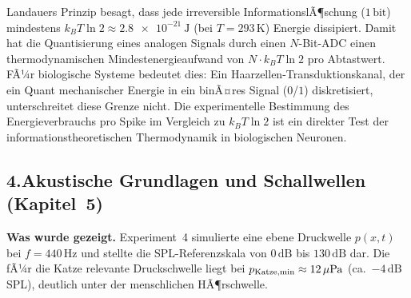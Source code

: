 ﻿\documentclass[12pt,a4paper,titlepage]{report}
\begin{document}
\begin{itemize}[leftmargin=2em]
    Landauers Prinzip besagt, dass jede irreversible InformationslÃ¶schung
    ($1\,\mathrm{bit}$) mindestens $k_B T \ln 2 \approx
    \SI{2.8e-21}{\joule}$ (bei $T=293\,\mathrm{K}$) Energie dissipiert.
    Damit hat die Quantisierung eines analogen Signals durch einen
    $N$-Bit-ADC einen thermodynamischen Mindestenergieaufwand von
    $N \cdot k_B T \ln 2$ pro Abtastwert.
    FÃ¼r biologische Systeme bedeutet dies: Ein Haarzellen-Transduktionskanal,
    der ein Quant mechanischer Energie in ein binÃ¤res Signal ($0$/$1$)
    diskretisiert, unterschreitet diese Grenze nicht.
    Die experimentelle Bestimmung des Energieverbrauchs pro Spike
    im Vergleich zu $k_B T \ln 2$ ist ein direkter Test der
    informationstheoretischen Thermodynamik in biologischen Neuronen.
\end{itemize}

\subsection*{4.\enspace Akustische Grundlagen und Schallwellen
(Kapitel~5)}

\textbf{Was wurde gezeigt.}
Experiment~4 simulierte eine ebene Druckwelle $p(x,t)$ bei $f=440\,\mathrm{Hz}$
und stellte die SPL-Referenzskala von $0\,\mathrm{dB}$ bis $130\,\mathrm{dB}$
dar.
Die fÃ¼r die Katze relevante Druckschwelle liegt bei
$p_{\rm Katze,min} \approx 12\,\mu\mathrm{Pa}$ (ca.\ $-4\,\mathrm{dB}$ SPL),
deutlich unter der menschlichen HÃ¶rschwelle.
\end{document}
